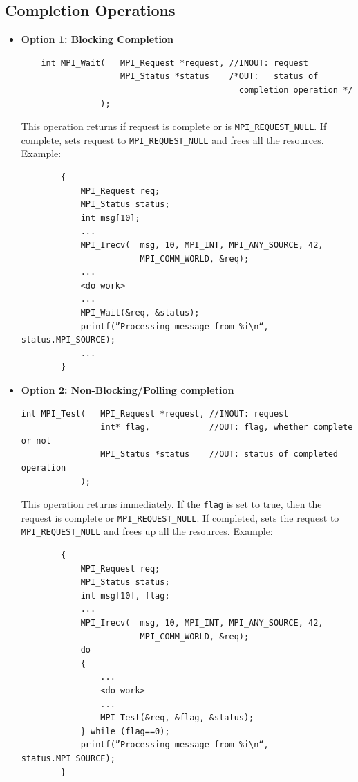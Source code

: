 \documentclass[12pt, a4paper]{report}
\begin{document}
\subsection{Completion Operations}
\begin{itemize}
    \item {\bfseries{Option 1: Blocking Completion}}
    \begin{verbatim}
    int MPI_Wait(   MPI_Request *request, //INOUT: request 
                    MPI_Status *status    /*OUT:   status of 
                                            completion operation */
                );
    \end{verbatim}
    \vspace{-3mm}This operation returns if request is complete or is \verb$MPI_REQUEST_NULL$. If complete, sets request to \verb$MPI_REQUEST_NULL$ and frees
    all the resources. Example:
    \begin{verbatim}
        {
            MPI_Request req;
            MPI_Status status;
            int msg[10];
            ...
            MPI_Irecv(  msg, 10, MPI_INT, MPI_ANY_SOURCE, 42,
                        MPI_COMM_WORLD, &req);
            ...
            <do work>
            ...
            MPI_Wait(&req, &status);
            printf(”Processing message from %i\n“, status.MPI_SOURCE);
            ...
        }
    \end{verbatim}

    \item {\bfseries{Option 2: Non-Blocking/Polling completion}}
    \begin{verbatim}
int MPI_Test(   MPI_Request *request, //INOUT: request
                int* flag,            //OUT: flag, whether complete or not
                MPI_Status *status    //OUT: status of completed operation
            );
    \end{verbatim}
    \vspace{-3mm} This operation returns immediately. If the \verb$flag$ is set to true, then the request is complete or \verb$MPI_REQUEST_NULL$. If 
    completed, sets the request to \verb$MPI_REQUEST_NULL$ and frees up all the resources. Example:
    \begin{verbatim}
        {
            MPI_Request req;
            MPI_Status status;
            int msg[10], flag;
            ...
            MPI_Irecv(  msg, 10, MPI_INT, MPI_ANY_SOURCE, 42,
                        MPI_COMM_WORLD, &req);
            do
            {
                ...
                <do work>
                ...
                MPI_Test(&req, &flag, &status);
            } while (flag==0);
            printf(”Processing message from %i\n“, status.MPI_SOURCE);
        }
    \end{verbatim}
\end{itemize}
\end{document}
